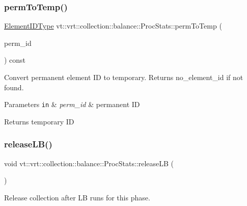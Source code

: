 \subsubsection{\texorpdfstring{perm\+To\+Temp()}{permToTemp()}}
{\footnotesize\ttfamily \hyperlink{namespacevt_1_1vrt_1_1collection_1_1balance_a14c8d2c972f2913aa3f1636e5be0a120}{Element\+I\+D\+Type} vt\+::vrt\+::collection\+::balance\+::\+Proc\+Stats\+::perm\+To\+Temp (\begin{DoxyParamCaption}\item[{\hyperlink{namespacevt_1_1vrt_1_1collection_1_1balance_a14c8d2c972f2913aa3f1636e5be0a120}{Element\+I\+D\+Type}}]{perm\+\_\+id }\end{DoxyParamCaption}) const}



Convert permanent element ID to temporary. Returns {\ttfamily no\+\_\+element\+\_\+id} if not found. 


\begin{DoxyParams}[1]{Parameters}
\mbox{\tt in}  & {\em perm\+\_\+id} & permanent ID\\
\hline
\end{DoxyParams}
\begin{DoxyReturn}{Returns}
temporary ID 
\end{DoxyReturn}
\mbox{\label{structvt_1_1vrt_1_1collection_1_1balance_1_1_proc_stats_a7865efba4c984b1b77a93b5cd04dc861}} 
\subsubsection{\texorpdfstring{release\+L\+B()}{releaseLB()}}
{\footnotesize\ttfamily void vt\+::vrt\+::collection\+::balance\+::\+Proc\+Stats\+::release\+LB (\begin{DoxyParamCaption}{ }\end{DoxyParamCaption})}



Release collection after LB runs for this phase. 

\mbox{\label{structvt_1_1vrt_1_1collection_1_1balance_1_1_proc_stats_a3215c14cb6679e9751b0fb51d5d72fe0}} 
